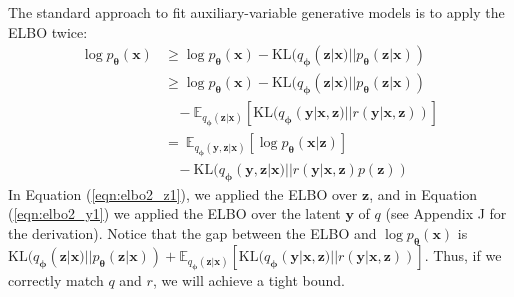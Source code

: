 \documentclass[letterpaper]{article} %
\newcommand{\bx}{\mathbf{x}}
\newcommand{\bz}{\mathbf{z}}
\newcommand{\by}{\mathbf{y}}
\newcommand\Exp{\mathbb{E}}
\newcommand\KL{\text{KL}}
\let\oldtheta\theta
\renewcommand{\theta}{{\boldsymbol \oldtheta}}
\let\oldphi\phi
\renewcommand{\phi}{{\boldsymbol \oldphi}}
\begin{document}
The standard approach to fit auxiliary-variable generative models \citep{maaloe2016auxiliary} is to apply the ELBO twice:
\begin{align}
    \log p_\theta(\bx) 
    & \geq \log p_\theta(\bx) - \KL(q_\phi(\bz|\bx)||p_\theta(\bz|\bx)) \label{eqn:elbo2_z1} \\
    & \geq \log p_\theta(\bx) - \KL(q_\phi(\bz|\bx)||p_\theta(\bz|\bx)) \label{eqn:elbo2_y1}  \\ \nonumber
    &~~~~ - \Exp_{q_\phi(\bz|\bx)} [ \KL(q_\phi(\by|\bx,\bz)||r(\by|\bx,\bz)) ] \\
    & = ~\Exp_{q_\phi(\by,\bz|\bx)} [\log p_\theta(\bx|\bz)] \label{eqn:elbo2_y2} \\ \nonumber
    &~~~~ -\KL(q_\phi(\by,\bz|\bx)||r(\by|\bx,\bz)p(\bz))
\end{align}
In Equation (\ref{eqn:elbo2_z1}), we applied the ELBO over $\bz$, and in Equation (\ref{eqn:elbo2_y1}) we applied the ELBO over the latent $\by$ of $q$ (see Appendix J for the derivation). 
Notice that the gap between the ELBO and $\log p_\theta(\bx)$ is $\KL(q_\phi(\bz|\bx)||p_\theta(\bz|\bx)) + \Exp_{q_\phi(\bz|\bx)} [ \KL(q_\phi(\by|\bx,\bz)||r(\by|\bx,\bz)) ]$. Thus, if we correctly match $q$ and $r$, we will achieve a tight bound.
\end{document}
